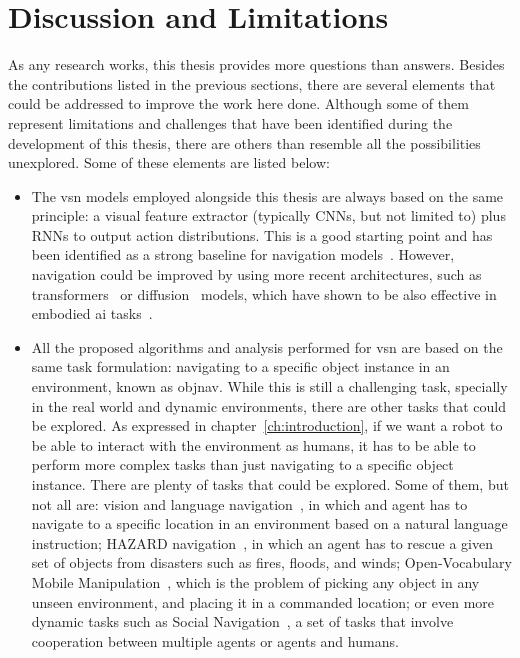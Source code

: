\section{Discussion and Limitations}\label{sec:discussion-and-limitations}

As any research works, this thesis provides more questions than answers.
Besides the contributions listed in the previous sections, there are several elements that could be addressed to improve the work here done.
Although some of them represent limitations and challenges that have been identified during the development of this thesis, there are others than resemble all the possibilities unexplored.
Some of these elements are listed below:
\begin{itemize}
    \item The \acrshort{vsn} models employed alongside this thesis are always based on the same principle: a visual feature extractor (typically CNNs, but not limited to) plus RNNs to output action distributions.
    This is a good starting point and has been identified as a strong baseline for navigation models~\cite{wijmans2020}.
    However, navigation could be improved by using more recent architectures, such as transformers~\cite{Vaswani2017AttentionIA} or diffusion~\cite{pmlr-v37-sohl-dickstein15} models, which have shown to be also effective in embodied \acrshort{ai} tasks~\cite{Shah2023ViNTAF, ren2025prior}.
    \item All the proposed algorithms and analysis performed for \acrshort{vsn} are based on the same task formulation: navigating to a specific object instance in an environment, known as \acrshort{objnav}.
    While this is still a challenging task, specially in the real world and dynamic environments, there are other tasks that could be explored.
    As expressed in chapter~\ref{ch:introduction}, if we want a robot to be able to interact with the environment as humans, it has to be able to perform more complex tasks than just navigating to a specific object instance.
    There are plenty of tasks that could be explored.
    Some of them, but not all are: vision and language navigation~\cite{Anderson2017VisionandLanguageNI}, in which and agent has to navigate to a specific location in an environment based on a natural language instruction; HAZARD navigation~\cite{Zhou2024HAZARDCE}, in which an agent has to rescue a given set of objects from disasters such as fires, floods, and winds; Open-Vocabulary Mobile Manipulation~\cite{homerobotovmm, homerobotovmmchallenge2023}, which is the problem of picking any object in any unseen environment, and placing it in a commanded location; or even more dynamic tasks such as Social Navigation~\cite{puig2024habitat}, a set of tasks that involve cooperation between multiple agents or agents and humans.

\end{itemize}
